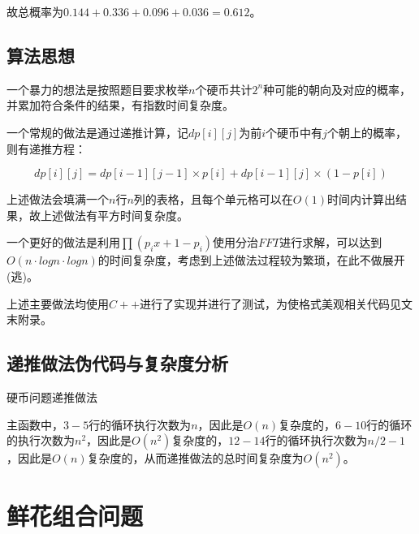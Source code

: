 \documentclass{article}
\begin{document}
故总概率为$0.144+0.336+0.096+0.036=0.612$。

\subsection{算法思想}

一个暴力的想法是按照题目要求枚举$n$个硬币共计$2^n$种可能的朝向及对应的概率，并累加符合条件的结果，有指数时间复杂度。

一个常规的做法是通过递推计算，记$dp[i][j]$为前$i$个硬币中有$j$个朝上的概率，则有递推方程：

$$
dp[i][j]=dp[i-1][j-1]\times{p}[i]+dp[i-1][j]\times(1-p[i])
$$

上述做法会填满一个$n$行$n$列的表格，且每个单元格可以在$O(1)$时间内计算出结果，故上述做法有平方时间复杂度。

一个更好的做法是利用$\prod(p_ix+1-p_i)$使用分治$FFT$进行求解，可以达到$O(n\cdot{log}n\cdot{log}n)$的时间复杂度，考虑到上述做法过程较为繁琐，在此不做展开(逃)。

上述主要做法均使用$C++$进行了实现并进行了测试，为使格式美观相关代码见文末附录。

\subsection{递推做法伪代码与复杂度分析}

\begin{algorithm}[H]

\caption{硬币问题递推做法}
\LinesNumbered
{}


\end{algorithm}

主函数中，$3-5$行的循环执行次数为$n$，因此是$O(n)$复杂度的，$6-10$行的循环的执行次数为$n^2$，因此是$O(n^2)$复杂度的，$12-14$行的循环执行次数为$n/2-1$，因此是$O(n)$复杂度的，从而递推做法的总时间复杂度为$O(n^2)$。

\section{鲜花组合问题}
\end{document}
